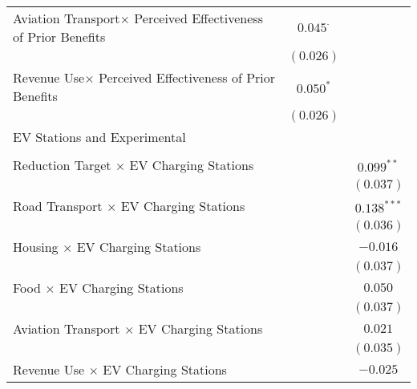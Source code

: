 \begin{center}
\begin{tiny}
\begin{longtable}{l@{} c@{} c@{}}
\quad Aviation Transport$\times$ Perceived Effectiveness of Prior Benefits & $0.045^{\cdot}$  &                  \\
                                                                           & $(0.026)$        &                  \\
\quad Revenue Use$\times$ Perceived Effectiveness of Prior Benefits        & $0.050^{*}$      &                  \\
                                                                           & $(0.026)$        &                  \\
EV Stations and Experimental                                               &                  &                  \\
                                                                           &                  &                  \\
\quad Reduction Target $\times$ EV Charging Stations                       &                  & $0.099^{**}$     \\
                                                                           &                  & $(0.037)$        \\
\quad Road Transport $\times$ EV Charging Stations                         &                  & $0.138^{***}$    \\
                                                                           &                  & $(0.036)$        \\
\quad Housing $\times$ EV Charging Stations                                &                  & $-0.016$         \\
                                                                           &                  & $(0.037)$        \\
\quad Food $\times$ EV Charging Stations                                   &                  & $0.050$          \\
                                                                           &                  & $(0.037)$        \\
\quad Aviation Transport $\times$ EV Charging Stations                     &                  & $0.021$          \\
                                                                           &                  & $(0.035)$        \\
\quad Revenue Use $\times$ EV Charging Stations                            &                  & $-0.025$         \\

\end{longtable}
\end{tiny}
\end{center}

